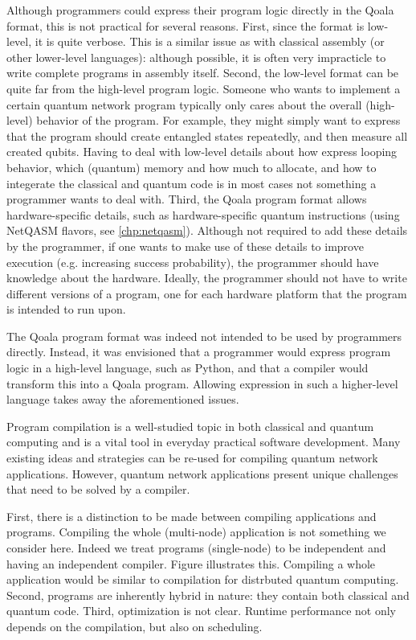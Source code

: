 Although programmers could express their program logic directly in the Qoala format, this is not practical for several reasons.
First, since the format is low-level, it is quite verbose.
This is a similar issue as with classical assembly (or other lower-level languages): although possible, it is often very impracticle to write complete programs in assembly itself.
Second, the low-level format can be quite far from the high-level program logic.
Someone who wants to implement a certain quantum network program typically only cares about the overall (high-level) behavior of the program.
For example, they might simply want to express that the program should create entangled states repeatedly, and then measure all created qubits.
Having to deal with low-level details about how express looping behavior, which (quantum) memory and how much to allocate, and how to integerate the classical and quantum code
is in most cases not something a programmer wants to deal with. 
Third, the Qoala program format allows hardware-specific details, such as hardware-specific quantum instructions (using NetQASM flavors, see \cref{chp:netqasm}).
Although not required to add these details by the programmer, if one wants to make use of these details to improve execution (e.g. increasing success probability), the programmer should have knowledge about the hardware.
Ideally, the programmer should not have to write different versions of a program, one for each hardware platform that the program is intended to run upon.

The Qoala program format was indeed not intended to be used by programmers directly.
Instead, it was envisioned that a programmer would express program logic in a high-level language, such as Python, and that a compiler would transform this into a Qoala program.
Allowing expression in such a higher-level language takes away the aforementioned issues.

Program compilation is a well-studied topic in both classical and quantum computing and is a vital tool in everyday practical software development.
Many existing ideas and strategies can be re-used for compiling quantum network applications.
However, quantum network applications present unique challenges that need to be solved by a compiler.

First, there is a distinction to be made between compiling applications and programs.
Compiling the whole (multi-node) application is not something we consider here.
Indeed we treat programs (single-node) to be independent and having an independent compiler.
Figure  illustrates this.
Compiling a whole application would be similar to compilation for distrbuted quantum computing.
Second, programs are inherently hybrid in nature: they contain both classical and quantum code.
Third, optimization is not clear.
Runtime performance not only depends on the compilation, but also on scheduling.


